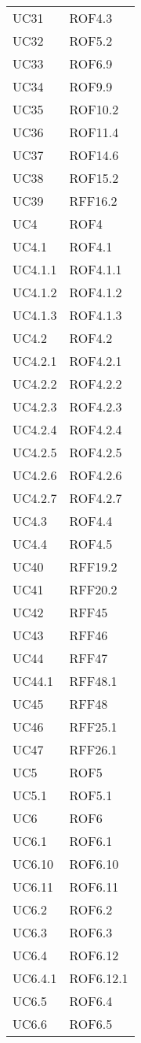 \begin{longtable}{p{2.5cm}!{\VRule[1pt]}p{2.5cm}}
	UC31 & ROF4.3\\
	UC32 & ROF5.2\\
	UC33 & ROF6.9\\
	UC34 & ROF9.9\\
	UC35 & ROF10.2\\
	UC36 & ROF11.4\\
	UC37 & ROF14.6\\
	UC38 & ROF15.2\\
	UC39 & RFF16.2\\
	UC4 & ROF4\\
	UC4.1 & ROF4.1\\
	UC4.1.1 & ROF4.1.1\\
	UC4.1.2 & ROF4.1.2\\
	UC4.1.3 & ROF4.1.3\\
	UC4.2 & ROF4.2\\
	UC4.2.1 & ROF4.2.1\\
	UC4.2.2 & ROF4.2.2\\
	UC4.2.3 & ROF4.2.3\\
	UC4.2.4 & ROF4.2.4\\
	UC4.2.5 & ROF4.2.5\\
	UC4.2.6 & ROF4.2.6\\
	UC4.2.7 & ROF4.2.7\\
	UC4.3 & ROF4.4\\
	UC4.4 & ROF4.5\\
	UC40 & RFF19.2\\
	UC41 & RFF20.2\\
	UC42 & RFF45\\
	UC43 & RFF46\\
	UC44 & RFF47\\
	UC44.1 & RFF48.1\\
	UC45 & RFF48\\
	UC46 & RFF25.1\\
	UC47 & RFF26.1\\
	UC5 & ROF5\\
	UC5.1 & ROF5.1\\
	UC6 & ROF6\\
	UC6.1 & ROF6.1\\
	UC6.10 & ROF6.10\\
	UC6.11 & ROF6.11\\
	UC6.2 & ROF6.2\\
	UC6.3 & ROF6.3\\
	UC6.4 & ROF6.12\\
	UC6.4.1 & ROF6.12.1\\
	UC6.5 & ROF6.4\\
	UC6.6 & ROF6.5\\

\end{longtable}
